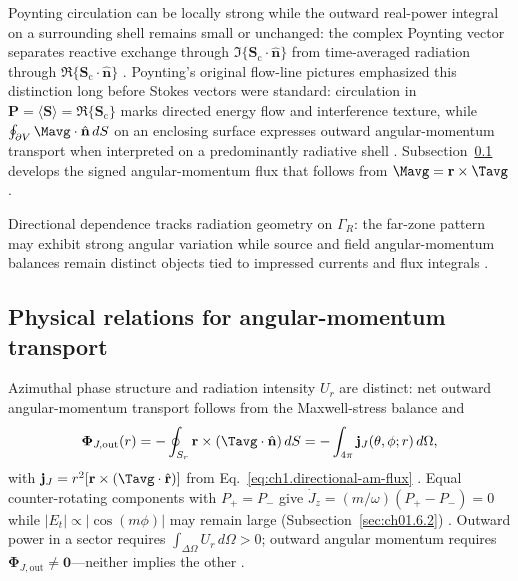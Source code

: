 Poynting circulation can be locally strong while the outward real-power integral on a surrounding shell remains small or unchanged: the complex Poynting vector separates reactive exchange through $\Im\{\mathbf{S}_\mathrm{c}\cdot\hat{\mathbf{n}}\}$ from time-averaged radiation through $\Re\{\mathbf{S}_\mathrm{c}\cdot\hat{\mathbf{n}}\}$ \cite{poynting1884}. Poynting's original flow-line pictures \cite{poynting1884} emphasized this
distinction long before Stokes vectors were standard: circulation in $\mathbf{P}=\langle\mathbf{S}\rangle=\Re\{\mathbf{S}_\mathrm{c}\}$ marks directed energy flow and interference texture, while $\oint_{\partial V}\Mavg\cdot\hat{\mathbf{n}}\,dS$ on an enclosing surface expresses outward angular-momentum transport when interpreted on a predominantly radiative shell \cite{poynting1884,beth1936}. Subsection~\ref{sec:ch01.2.3} develops the signed angular-momentum flux that follows from $\Mavg=\mathbf{r}\times\Tavg$ \cite{stratton1941}.

Directional dependence tracks radiation geometry on $\Gamma_R$: the far-zone pattern may exhibit strong angular variation while source and field angular-momentum balances remain distinct objects tied to impressed currents and flux integrals \cite{belinfante1940}.
\subsection{Physical relations for angular-momentum transport}
\label{sec:ch01.2.3}

Azimuthal phase structure and radiation intensity $U_r$ are distinct: net outward angular-momentum transport follows from the Maxwell-stress balance and
\begin{equation}
\label{eq:ch1.am-net-transport-condition}
\boldsymbol{\Phi}_{J,\mathrm{out}}(r)=-\oint_{S_r}\mathbf{r}\times(\Tavg\cdot\hat{\mathbf{n}})\,dS
=-\int_{4\pi}\mathbf{j}_J(\theta,\phi;r)\,d\Omega,
\end{equation}
with $\mathbf{j}_J=r^2[\mathbf{r}\times(\Tavg\cdot\hat{\mathbf{r}})]$ from Eq.~\eqref{eq:ch1.directional-am-flux} \cite{stratton1941,beth1936}. Equal counter-rotating components with $P_+=P_-$ give $\dot J_z=(m/\omega)(P_+-P_-)=0$ while $|E_t|\propto|\cos(m\phi)|$ may remain large (Subsection~\ref{sec:ch01.6.2}) \cite{allen1992}. Outward power in a sector requires $\int_{\Delta\Omega}U_r\,d\Omega>0$; outward angular momentum requires $\boldsymbol{\Phi}_{J,\mathrm{out}}\neq\mathbf{0}$---neither implies the other \cite{poynting1884}.
\label{eq:ch1.flux-qualified-decision}%
\label{eq:ch1.transport-charge-continuous-index}%
\label{tab:ch1.triad-numeric-dipole}

